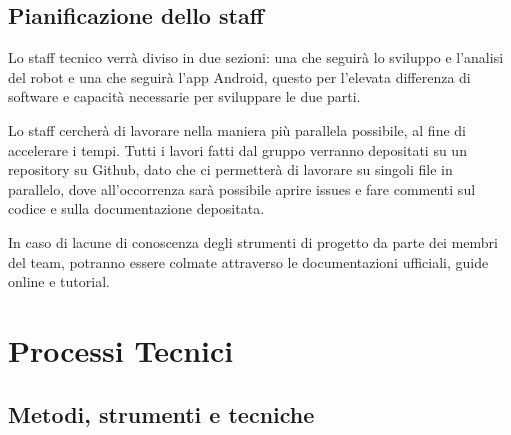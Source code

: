 \documentclass{article}
\begin{document}
\subsection{Pianificazione dello
staff}

Lo staff tecnico verrà diviso in due sezioni: una che seguirà lo
sviluppo e l'analisi del robot e una che seguirà l'app Android, questo
per l'elevata differenza di software e capacità necessarie per
sviluppare le due parti.

Lo staff cercherà di lavorare nella maniera più parallela possibile, al fine di accelerare i tempi. Tutti i lavori fatti dal gruppo verranno depositati su un repository su Github, dato che ci permetterà di lavorare su singoli file in parallelo, dove all'occorrenza sarà possibile aprire issues e fare commenti sul codice e sulla documentazione depositata.

In caso di lacune di conoscenza degli strumenti di progetto da parte dei membri del team, potranno essere colmate attraverso le documentazioni ufficiali, guide online e tutorial.

\section{Processi Tecnici}

\subsection{Metodi, strumenti e
tecniche}
\end{document}
